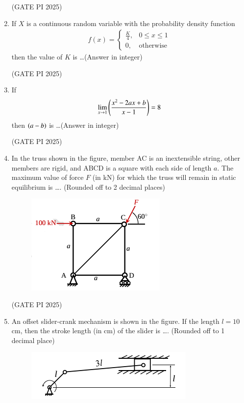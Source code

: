 \documentclass[journal,12pt,onecolumn]{IEEEtran}
\theoremstyle{remark}
\begin{document}
\begin{enumerate}
\hfill (GATE PI 2025)

\item If $X$ is a continuous random variable with the probability density function
\begin{align*}
f(x) = 
\begin{cases}
\frac{K}{4}, & 0 \leq x \leq 1 \\
0, & \text{otherwise}
\end{cases}
\end{align*}
then the value of $K$ is \dots (Answer in integer)

\hfill (GATE PI 2025)

\item If
\begin{align*}
\lim_{x \to 1} \left( \frac{x^2 - 2ax + b}{x-1} \right) = 8 
\end{align*}
then $\left(a-b\right)$ is \dots (Answer in integer)

\hfill (GATE PI 2025)

\item In the truss shown in the figure, member AC is an inextensible string, other members are rigid, and ABCD is a square with each side of length $a$. The maximum value of force $F$ (in kN) for which the truss will remain in static equilibrium is \dots . (Rounded off to 2 decimal places)

\begin{figure}[H]
\centering
\includegraphics[width=0.5\columnwidth]{fig7.png}
\caption{}
\end{figure}

\hfill (GATE PI 2025)

\item An offset slider-crank mechanism is shown in the figure. If the length $l=10$ cm, then the stroke length (in cm) of the slider is \dots . (Rounded off to 1 decimal place)

\begin{figure}[H]
\centering
\includegraphics[width=0.5\columnwidth]{fig8.png}
\caption{}
\end{figure}


\end{enumerate}
\end{document}
